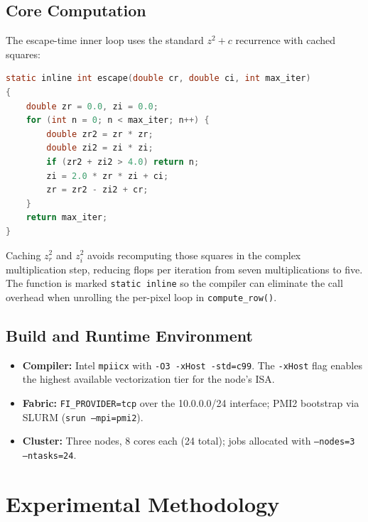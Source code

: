 \documentclass[11pt]{article}
\begin{document}
\subsection{Core Computation}

The escape-time inner loop uses the standard $z^2 + c$ recurrence with cached
squares:

\begin{lstlisting}[language=C, caption={Escape-time computation kernel (\texttt{escape()} in \texttt{mandelbrot.c}).}]
static inline int escape(double cr, double ci, int max_iter)
{
    double zr = 0.0, zi = 0.0;
    for (int n = 0; n < max_iter; n++) {
        double zr2 = zr * zr;
        double zi2 = zi * zi;
        if (zr2 + zi2 > 4.0) return n;
        zi = 2.0 * zr * zi + ci;
        zr = zr2 - zi2 + cr;
    }
    return max_iter;
}
\end{lstlisting}

Caching $z_r^2$ and $z_i^2$ avoids recomputing those squares in the complex
multiplication step, reducing flops per iteration from seven multiplications to
five. The function is marked \texttt{static inline} so the compiler can
eliminate the call overhead when unrolling the per-pixel loop in
\texttt{compute\_row()}.

\subsection{Build and Runtime Environment}

\begin{itemize}
  \item \textbf{Compiler:} Intel \texttt{mpiicx} with
        \texttt{-O3 -xHost -std=c99}. The \texttt{-xHost} flag enables the
        highest available vectorization tier for the node's ISA.
  \item \textbf{Fabric:} \texttt{FI\_PROVIDER=tcp} over the 10.0.0.0/24
        interface; PMI2 bootstrap via SLURM (\texttt{srun --mpi=pmi2}).
  \item \textbf{Cluster:} Three nodes, 8 cores each (24 total); jobs allocated
        with \texttt{--nodes=3 --ntasks=24}.
\end{itemize}

\section{Experimental Methodology}
\end{document}

